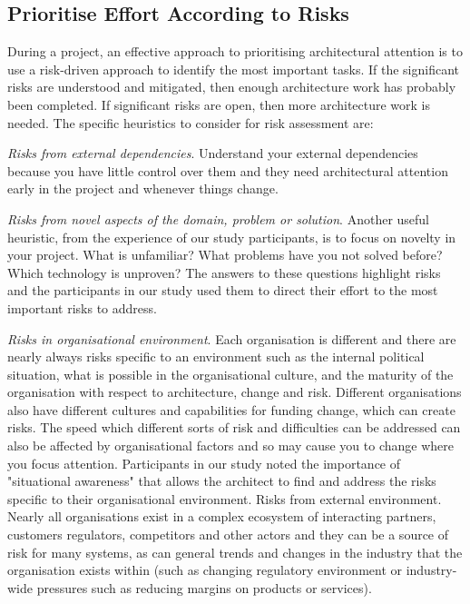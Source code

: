 \subsection{Prioritise Effort According to Risks}

During a project, an effective approach to prioritising architectural attention is to use a risk-driven approach to identify the most important tasks.  If the significant risks are understood and mitigated, then enough architecture work has probably been completed.  If significant risks are open, then more architecture work is needed. The specific heuristics to consider for risk assessment are:

\begin{description}
	\item \emph{Risks from external dependencies}.  Understand your external dependencies because you have little control over them and they need architectural attention early in the project and whenever things change.
	\item \emph{Risks from novel aspects of the domain, problem or solution}.  Another useful heuristic, from the experience of our study participants, is to focus on novelty in your project.  What is unfamiliar?  What problems have you not solved before?  Which technology is unproven? The answers to these questions highlight risks and the participants in our study used them to direct their effort to the most important risks to address.
	\item \emph{Risks in organisational environment}.  Each organisation is different and there are nearly always risks specific to an environment such as the internal political situation, what is possible in the organisational culture, and the maturity of the organisation with respect to architecture, change and risk.  Different organisations also have different cultures and capabilities for funding change, which can create risks.  The speed which different sorts of risk and difficulties can be addressed can also be affected by organisational factors and so may cause you to change where you focus attention.  Participants in our study noted the importance of "situational awareness" \cite{wikipedia-sitawareness} that allows the architect to find and address the risks specific to their organisational environment.
	Risks from external environment.  Nearly all organisations exist in a complex ecosystem of interacting partners, customers regulators, competitors and other actors and they can be a source of risk for many systems, as can general trends and changes in the industry that the organisation exists within (such as changing regulatory environment or industry-wide pressures such as reducing margins on products or services). 

\end{description}
